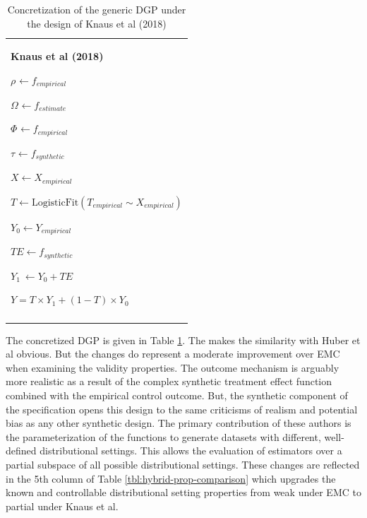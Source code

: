 \documentclass[../main.tex]{subfiles}
\begin{document}
\begin{table}[H]
 			\centering
\begin{tabular}{p{3.14in}}
\hline
\multicolumn{1}{|p{3.14in}|}{\textbf{Knaus et al (2018)} \par  \(  \rho _{} \leftarrow f_{empirical}~ \)  \par  \(  \Omega _{} \leftarrow f_{estimate} \)  \par  \(  \Phi _{} \leftarrow f_{empirical} \)  \par  \(  \tau_{} \leftarrow f_{synthetic}~ \)  \par  \( X \leftarrow X_{empirical} \)  \par  \( T \leftarrow \text{LogisticFit} \left(  T_{empirical} \sim X_{empirical} \right)  \)  \par  \( Y_{0} \leftarrow Y_{empirical} \)  \par  \( TE \leftarrow f_{synthetic} \)  \par  \( Y_{1}~ \leftarrow Y_{0}+ TE \)  \par  \( Y = T \times Y_{1}+  \left( 1-T \right)  \times Y_{0} \)  \par } \\
\hhline{-}
\end{tabular}
\caption{Concretization of the generic DGP under the design of Knaus et al (2018)}
\label{tbl:knaus-hybrid}
\end{table}

The concretized DGP is given in Table \ref{tbl:knaus-hybrid}. The makes the similarity with Huber et al obvious. But the changes do represent a moderate improvement over EMC when examining the validity properties. The outcome mechanism is arguably more realistic as a result of the complex synthetic treatment effect function combined with the empirical control outcome. But, the synthetic component of the specification opens this design to the same criticisms of realism and potential bias as any other synthetic design. The primary contribution of these authors is the parameterization of the functions to generate datasets with different, well-defined distributional settings. This allows the evaluation of estimators over a partial subspace of all possible distributional settings. These changes are reflected in the 5th column of Table \ref{tbl:hybrid-prop-comparison} which upgrades the known and controllable distributional setting properties from weak under EMC to partial under Knaus et al.\par
\end{document}
